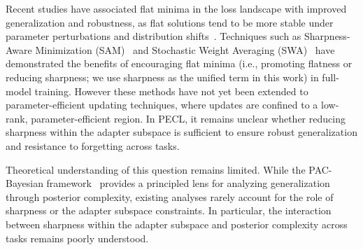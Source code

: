 \documentclass[letterpaper]{article} %
\begin{document}



Recent studies have associated flat minima in the loss landscape with improved generalization and robustness, as flat solutions tend to be more stable under parameter perturbations and distribution shifts~\cite{wu2017understandinggeneralizationdeeplearning,chaudhariEntropySGDBiasingGradient2019,NEURIPS2020_518a38cc,NEURIPS2021_995f5e03,JMLRAnEmpiricalInvestigatio,yangRevisitingFlatnessAwareOptimization2025}. Techniques such as Sharpness-Aware Minimization (SAM)~\cite{foretSharpnessAwareMinimizationEfficiently2021} and Stochastic Weight Averaging (SWA)~\cite{izmailovAveragingWeightsLeads2019} have demonstrated the benefits of encouraging flat minima  (i.e., promoting flatness or reducing sharpness; we use sharpness as the unified term in this work) in full-model training. However these methods have not yet been extended to parameter-efficient updating techniques, where updates are confined to a low-rank, parameter-efficient region.
In PECL, it remains unclear whether reducing sharpness within the adapter subspace is sufficient to ensure robust generalization and resistance to forgetting across tasks.


Theoretical understanding of this question remains limited. While the PAC-Bayesian framework~\cite{mcallesterPACBayesianStochasticModel2003,PAC-Bayesiansupervisedclassification2007,pentinaPACBayesianBoundLifelong2014,germainPACBayesianTheoryMeets2016,lotfiPACBayesCompressionBounds2022} provides a principled lens for analyzing generalization through posterior complexity, existing analyses rarely account for the role of sharpness or the adapter subspace constraints. In particular, the interaction between sharpness within the adapter subspace and posterior complexity across tasks remains poorly understood.
\end{document}
